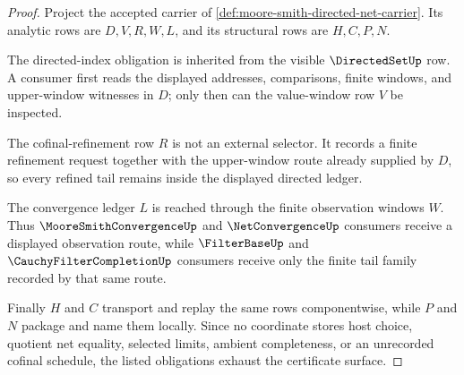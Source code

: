 \begin{proof}
Project the accepted carrier of \autoref{def:moore-smith-directed-net-carrier}. Its analytic rows are $D,V,R,W,L$, and its structural rows are $H,C,P,N$.

The directed-index obligation is inherited from the visible $\DirectedSetUp$ row. A consumer first reads the displayed addresses, comparisons, finite windows, and upper-window witnesses in $D$; only then can the value-window row $V$ be inspected.

The cofinal-refinement row $R$ is not an external selector. It records a finite refinement request together with the upper-window route already supplied by $D$, so every refined tail remains inside the displayed directed ledger.

The convergence ledger $L$ is reached through the finite observation windows $W$. Thus $\MooreSmithConvergenceUp$ and $\NetConvergenceUp$ consumers receive a displayed observation route, while $\FilterBaseUp$ and $\CauchyFilterCompletionUp$ consumers receive only the finite tail family recorded by that same route.

Finally $H$ and $C$ transport and replay the same rows componentwise, while $P$ and $N$ package and name them locally. Since no coordinate stores host choice, quotient net equality, selected limits, ambient completeness, or an unrecorded cofinal schedule, the listed obligations exhaust the certificate surface.
\end{proof}

